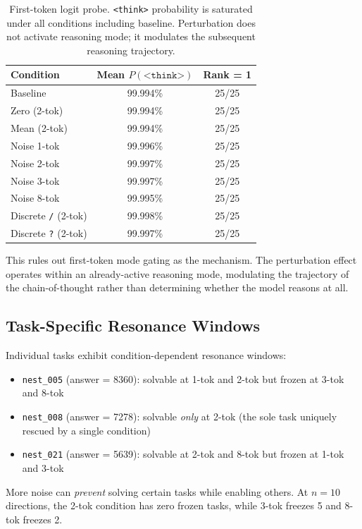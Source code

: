 \documentclass{article}
\begin{document}
\begin{table}[h]
\centering
\small
\begin{tabular}{lcc}
\toprule
\textbf{Condition} & \textbf{Mean $P(\texttt{<think>})$} & \textbf{Rank = 1} \\
\midrule
Baseline & 99.994\% & 25/25 \\
Zero (2-tok) & 99.994\% & 25/25 \\
Mean (2-tok) & 99.994\% & 25/25 \\
Noise 1-tok & 99.996\% & 25/25 \\
Noise 2-tok & 99.997\% & 25/25 \\
Noise 3-tok & 99.997\% & 25/25 \\
Noise 8-tok & 99.995\% & 25/25 \\
Discrete \texttt{/} (2-tok) & 99.998\% & 25/25 \\
Discrete \texttt{?} (2-tok) & 99.997\% & 25/25 \\
\bottomrule
\end{tabular}
\caption{First-token logit probe. \texttt{<think>} probability is
saturated under all conditions including baseline. Perturbation does
not activate reasoning mode; it modulates the subsequent reasoning
trajectory.}
\label{tab:probe}
\end{table}

This rules out first-token mode gating as the mechanism. The
perturbation effect operates within an already-active reasoning mode,
modulating the trajectory of the chain-of-thought rather than
determining whether the model reasons at all.

\subsection{Task-Specific Resonance Windows} %

Individual tasks exhibit condition-dependent resonance windows:
\begin{itemize}
    \item \texttt{nest\_005} (answer = 8360): solvable at 1-tok and
    2-tok but frozen at 3-tok and 8-tok
    \item \texttt{nest\_008} (answer = 7278): solvable \emph{only}
    at 2-tok (the sole task uniquely rescued by a single condition)
    \item \texttt{nest\_021} (answer = 5639): solvable at 2-tok and
    8-tok but frozen at 1-tok and 3-tok
\end{itemize}
More noise can \emph{prevent} solving certain tasks while enabling
others. At $n = 10$ directions, the 2-tok condition has zero frozen
tasks, while 3-tok freezes 5 and 8-tok freezes 2.
\end{document}
